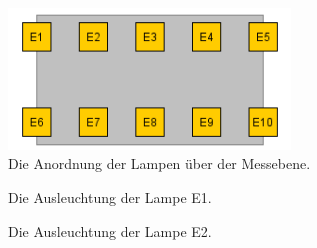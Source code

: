 \documentclass[a4paper,bibtotoc,oneside]{scrbook}
\begin{document}
\begin{figure}[htbp]
\centering
\includegraphics[width=75mm]{img/lampen.png}
\caption{Die Anordnung der Lampen über der Messebene.}\label{lampen}
\end{figure}

\begin{figure} [htbp]
\caption{Die Ausleuchtung der Lampe E1.}
\label{E1}
\end{figure} 

\begin{figure} [htbp]
\caption{Die Ausleuchtung der Lampe E2.}
\label{E2}
\end{figure} 
\end{document}
